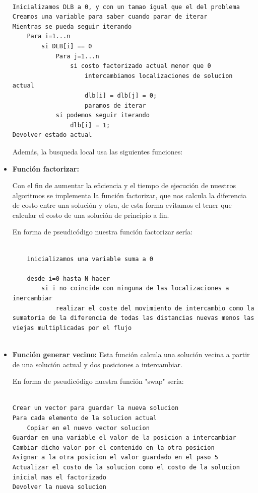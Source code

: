 \begin{itemize}
					\begin{lstlisting}[language=SH]
					
Inicializamos DLB a 0, y con un tamao igual que el del problema
Creamos una variable para saber cuando parar de iterar
Mientras se pueda seguir iterando
	Para i=1...n
		si DLB[i] == 0
			Para j=1...n
				si costo factorizado actual menor que 0
					intercambiamos localizaciones de solucion actual
					dlb[i] = dlb[j] = 0;
					paramos de iterar
			si podemos seguir iterando
				dlb[i] = 1;
Devolver estado actual
					\end{lstlisting}

Además, la busqueda local usa las siguientes funciones:
\newpage
	\item \textbf{Función factorizar:}
	
	Con el fin de aumentar la eficiencia y el tiempo de ejecución de nuestros algoritmos se implementa la función factorizar, que nos calcula la diferencia de costo entre una solución y otra, de esta forma evitamos el tener que calcular el costo de una solución de principio a fin.
	
	En forma de pseudicódigo nuestra función factorizar sería:
	
	\begin{lstlisting}[language=SH]
	
    inicializamos una variable suma a 0
    
    desde i=0 hasta N hacer
	    si i no coincide con ninguna de las localizaciones a inercambiar
		    realizar el coste del movimiento de intercambio como la sumatoria de la diferencia de todas las distancias nuevas menos las viejas multiplicadas por el flujo
	
	\end{lstlisting}

	\item \textbf{Función generar vecino:}	
	Esta función calcula una solución vecina a partir de una solución actual y dos posiciones a intercambiar.
	
	En forma de pseudicódigo nuestra función "swap" sería:
	
	\begin{lstlisting}[language=SH]

Crear un vector para guardar la nueva solucion
Para cada elemento de la solucion actual
	Copiar en el nuevo vector solucion
Guardar en una variable el valor de la posicion a intercambiar
Cambiar dicho valor por el contenido en la otra posicion
Asignar a la otra posicion el valor guardado en el paso 5 
Actualizar el costo de la solucion como el costo de la solucion inicial mas el factorizado
Devolver la nueva solucion


\end{lstlisting}
\end{itemize}
